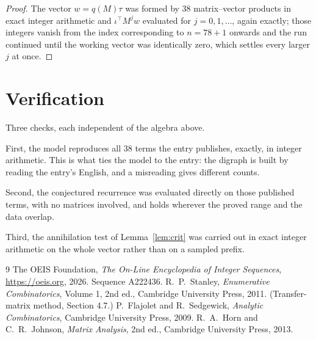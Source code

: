 \documentclass[11pt,a4paper]{article}
\theoremstyle{plain}
\theoremstyle{definition}
\begin{document}
\begin{proof}
The vector $w=q(M)\tau$ was formed by $38$ matrix--vector products in exact integer
arithmetic and $\iota^{\!\top}M^{j}w$ evaluated for $j=0,1,\dots$, again exactly; those
integers vanish from the index corresponding to $n=78+1$ onwards and the run continued
until the working vector was identically zero, which settles every larger $j$ at once.
\end{proof}

\section{Verification}

Three checks, each independent of the algebra above.

First, the model reproduces all $38$ terms the entry publishes, exactly, in integer
arithmetic. This is what ties the model to the entry: the digraph is built by reading the
entry's English, and a misreading gives different counts.

Second, the conjectured recurrence was evaluated directly on those published terms, with no
matrices involved, and holds wherever the proved range and the data overlap.

Third, the annihilation test of Lemma~\ref{lem:crit} was carried out in exact integer
arithmetic on the whole vector rather than on a sampled prefix.

\begin{thebibliography}{9}
 The OEIS Foundation, \emph{The On-Line Encyclopedia of Integer
Sequences}, \url{https://oeis.org}, 2026. Sequence A222436.
 R.~P.~Stanley, \emph{Enumerative Combinatorics}, Volume 1, 2nd ed.,
Cambridge University Press, 2011. (Transfer-matrix method, Section 4.7.)
 P.~Flajolet and R.~Sedgewick, \emph{Analytic Combinatorics}, Cambridge
University Press, 2009.
 R.~A.~Horn and C.~R.~Johnson, \emph{Matrix Analysis}, 2nd ed., Cambridge
University Press, 2013.
\end{thebibliography}
\end{document}
